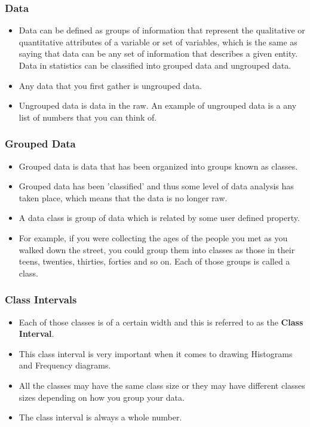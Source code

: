 \documentclass{beamer}
\begin{document}
\begin{frame}
\frametitle{Data}
\Large
\begin{itemize}
\item Data can be defined as groups of information that represent the qualitative or quantitative attributes of a variable or set of variables, which is the same as saying that data can be any set of information that describes a given entity. Data in statistics can be classified into grouped data and ungrouped data.

\item Any data that you first gather is ungrouped data. 
\item Ungrouped data is data in the raw. An example of ungrouped data is a any list of numbers that you can think of.
\end{itemize}
\end{frame}
\begin{frame}
\frametitle{Grouped Data}
\Large
\begin{itemize}
\item Grouped data is data that has been organized into groups known as classes. 
\item Grouped data has been 'classified' and thus some level of 
data analysis has taken place, which means that the data is no longer raw.
\item A data class is group of data which is related by some user defined property. 
\item 
For example, if you were collecting the ages of the people you met as you walked down the street, you could group them into classes as those in 
their teens, twenties, thirties, forties and so on. Each of those groups is called a class.
\end{itemize}
\end{frame}
\begin{frame}
\frametitle{Class Intervals}
\Large
\begin{itemize}
\item Each of those classes is of a certain width and this is referred to as the \textbf{Class Interval}. 
\item This class interval is very important when it comes to drawing Histograms and Frequency diagrams. 
\item All the classes may have the same class size or they may have different classes sizes depending on how you group your data. 
\item The class interval is always a whole number.
\end{itemize}

\end{frame}
\end{document}
